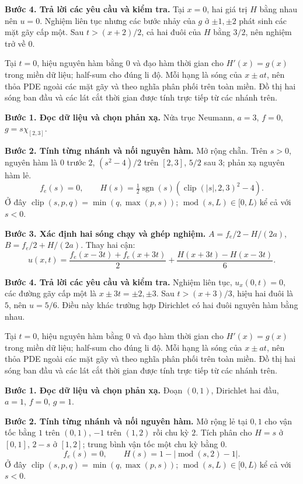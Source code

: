 \textbf{Bước 4. Trả lời các yêu cầu và kiểm tra.} Tại $x=0$, hai giá trị $H$ bằng nhau nên $u=0$. Nghiệm liên tục nhưng các bước nhảy của $g$ ở $\pm1,\pm2$ phát sinh các mặt gãy cấp một. Sau $t>(x+2)/2$, cả hai đuôi của $H$ bằng $3/2$, nên nghiệm trở về $0$.

Tại $t=0$, hiệu nguyên hàm bằng $0$ và đạo hàm thời gian cho $H'(x)=g(x)$ trong miền dữ liệu; half-sum cho đúng li độ. Mỗi hạng là sóng của $x\pm at$, nên thỏa PDE ngoài các mặt gãy và theo nghĩa phân phối trên toàn miền. Đồ thị hai sóng ban đầu và các lát cắt thời gian được tính trực tiếp từ các nhánh trên.

\textbf{Bước 1. Đọc dữ liệu và chọn phản xạ.} Nửa trục Neumann, $a=3$, $f=0$, $g=s\chi_{[2,3]}$.

\textbf{Bước 2. Tính từng nhánh và nối nguyên hàm.} Mở rộng chẵn. Trên $s>0$, nguyên hàm là $0$ trước $2$, $(s^2-4)/2$ trên $[2,3]$, $5/2$ sau $3$; phản xạ nguyên hàm lẻ.
\[f_e(s)=0,\qquad H(s)=\tfrac12\operatorname{sgn}(s)(\operatorname{clip}(|s|,2,3)^2-4).\]
Ở đây $\operatorname{clip}(s,p,q)=\min(q,\max(p,s))$; $\operatorname{mod}(s,L)\in[0,L)$ kể cả với $s<0$.

\textbf{Bước 3. Xác định hai sóng chạy và ghép nghiệm.} $A=f_e/2-H/(2a)$, $B=f_e/2+H/(2a)$. Thay hai cận:
\[u(x,t)=\frac{f_e(x-3t)+f_e(x+3t)}2+\frac{H(x+3t)-H(x-3t)}{6}.\]

\textbf{Bước 4. Trả lời các yêu cầu và kiểm tra.} Nghiệm liên tục, $u_x(0,t)=0$, các đường gãy cấp một là $x\pm3t=\pm2,\pm3$. Sau $t>(x+3)/3$, hiệu hai đuôi là $5$, nên $u=5/6$. Điều này khác trường hợp Dirichlet có hai đuôi nguyên hàm bằng nhau.

Tại $t=0$, hiệu nguyên hàm bằng $0$ và đạo hàm thời gian cho $H'(x)=g(x)$ trong miền dữ liệu; half-sum cho đúng li độ. Mỗi hạng là sóng của $x\pm at$, nên thỏa PDE ngoài các mặt gãy và theo nghĩa phân phối trên toàn miền. Đồ thị hai sóng ban đầu và các lát cắt thời gian được tính trực tiếp từ các nhánh trên.

\textbf{Bước 1. Đọc dữ liệu và chọn phản xạ.} Đoạn $(0,1)$, Dirichlet hai đầu, $a=1$, $f=0$, $g=1$.

\textbf{Bước 2. Tính từng nhánh và nối nguyên hàm.} Mở rộng lẻ tại $0,1$ cho vận tốc bằng $1$ trên $(0,1)$, $-1$ trên $(1,2)$ rồi chu kỳ $2$. Tích phân cho $H=s$ ở $[0,1]$, $2-s$ ở $[1,2]$; trung bình vận tốc một chu kỳ bằng $0$.
\[f_e(s)=0,\qquad H(s)=1-|\operatorname{mod}(s,2)-1|.\]
Ở đây $\operatorname{clip}(s,p,q)=\min(q,\max(p,s))$; $\operatorname{mod}(s,L)\in[0,L)$ kể cả với $s<0$.

